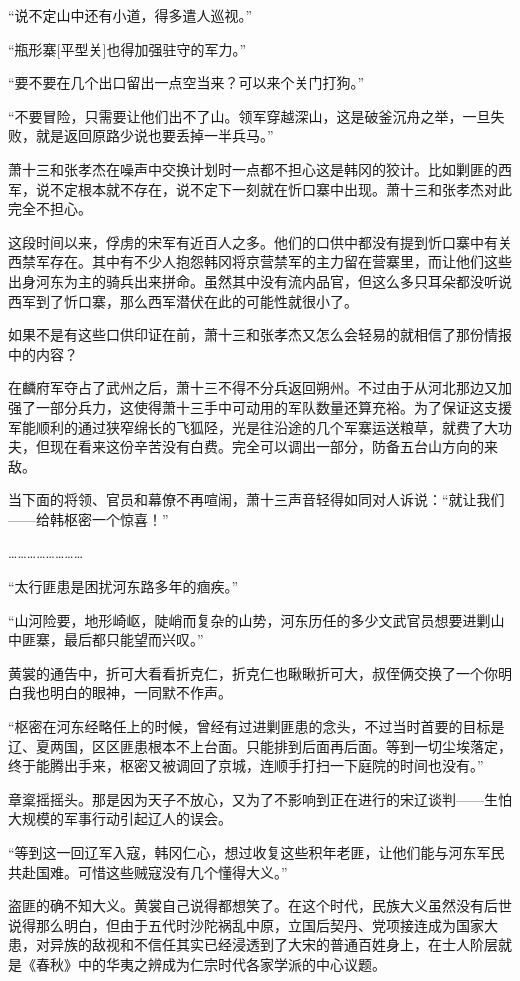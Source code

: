 “说不定山中还有小道，得多遣人巡视。”

“瓶形寨[平型关]也得加强驻守的军力。”

“要不要在几个出口留出一点空当来？可以来个关门打狗。”

“不要冒险，只需要让他们出不了山。领军穿越深山，这是破釜沉舟之举，一旦失败，就是返回原路少说也要丢掉一半兵马。”

萧十三和张孝杰在噪声中交换计划时一点都不担心这是韩冈的狡计。比如剿匪的西军，说不定根本就不存在，说不定下一刻就在忻口寨中出现。萧十三和张孝杰对此完全不担心。

这段时间以来，俘虏的宋军有近百人之多。他们的口供中都没有提到忻口寨中有关西禁军存在。其中有不少人抱怨韩冈将京营禁军的主力留在营寨里，而让他们这些出身河东为主的骑兵出来拼命。虽然其中没有流内品官，但这么多只耳朵都没听说西军到了忻口寨，那么西军潜伏在此的可能性就很小了。

如果不是有这些口供印证在前，萧十三和张孝杰又怎么会轻易的就相信了那份情报中的内容？

在麟府军夺占了武州之后，萧十三不得不分兵返回朔州。不过由于从河北那边又加强了一部分兵力，这使得萧十三手中可动用的军队数量还算充裕。为了保证这支援军能顺利的通过狭窄绵长的飞狐陉，光是往沿途的几个军寨运送粮草，就费了大功夫，但现在看来这份辛苦没有白费。完全可以调出一部分，防备五台山方向的来敌。

当下面的将领、官员和幕僚不再喧闹，萧十三声音轻得如同对人诉说：“就让我们——给韩枢密一个惊喜！”

……………………

“太行匪患是困扰河东路多年的痼疾。”

“山河险要，地形崎岖，陡峭而复杂的山势，河东历任的多少文武官员想要进剿山中匪寨，最后都只能望而兴叹。”

黄裳的通告中，折可大看看折克仁，折克仁也瞅瞅折可大，叔侄俩交换了一个你明白我也明白的眼神，一同默不作声。

“枢密在河东经略任上的时候，曾经有过进剿匪患的念头，不过当时首要的目标是辽、夏两国，区区匪患根本不上台面。只能排到后面再后面。等到一切尘埃落定，终于能腾出手来，枢密又被调回了京城，连顺手打扫一下庭院的时间也没有。”

章楶摇摇头。那是因为天子不放心，又为了不影响到正在进行的宋辽谈判——生怕大规模的军事行动引起辽人的误会。

“等到这一回辽军入寇，韩冈仁心，想过收复这些积年老匪，让他们能与河东军民共赴国难。可惜这些贼寇没有几个懂得大义。”

盗匪的确不知大义。黄裳自己说得都想笑了。在这个时代，民族大义虽然没有后世说得那么明白，但由于五代时沙陀祸乱中原，立国后契丹、党项接连成为国家大患，对异族的敌视和不信任其实已经浸透到了大宋的普通百姓身上，在士人阶层就是《春秋》中的华夷之辨成为仁宗时代各家学派的中心议题。

